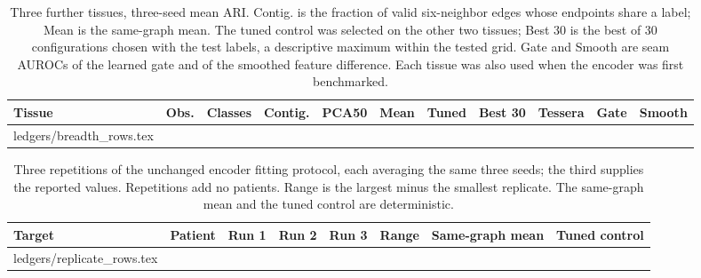 \documentclass[11pt]{article}
\makeatletter
\let\tableinput\@@input
\makeatother
\begin{document}
\begin{table}[H]\centering\scriptsize\setlength{\tabcolsep}{2.6pt}
\caption{Three further tissues, three-seed mean ARI. Contig. is the fraction of valid six-neighbor edges whose endpoints share a label; Mean is the same-graph mean. The tuned control was selected on the other two tissues; Best 30 is the best of 30 configurations chosen with the test labels, a descriptive maximum within the tested grid. Gate and Smooth are seam AUROCs of the learned gate and of the smoothed feature difference. Each tissue was also used when the encoder was first benchmarked.}\label{tab:breadth}
\begin{tabular}{lrrrrrrrrrr}\toprule
Tissue & Obs. & Classes & Contig. & PCA50 & Mean & Tuned & Best 30 & Tessera & Gate & Smooth\\\midrule
\tableinput ledgers/breadth_rows.tex
\bottomrule\end{tabular}\end{table}
\begin{table}[H]\centering\scriptsize\setlength{\tabcolsep}{5pt}
\caption{Three repetitions of the unchanged encoder fitting protocol, each averaging the same three seeds; the third supplies the reported values. Repetitions add no patients. Range is the largest minus the smallest replicate. The same-graph mean and the tuned control are deterministic.}\label{tab:replicates}
\begin{tabular}{llrrrrrr}\toprule
Target & Patient & Run 1 & Run 2 & Run 3 & Range & Same-graph mean & Tuned control\\\midrule
\tableinput ledgers/replicate_rows.tex
\bottomrule\end{tabular}\end{table}
\clearpage
\end{document}
